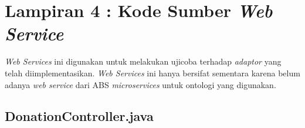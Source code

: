 \chapter*{Lampiran 4 : Kode Sumber \textit{Web Service}}
\textit{Web Services} ini digunakan untuk melakukan ujicoba terhadap \textit{adaptor} yang telah diimplementasikan. \textit{Web Services} ini hanya bersifat sementara karena belum adanya \textit{web service} dari ABS \textit{microservices} untuk ontologi yang digunakan.
\section*{DonationController.java}

